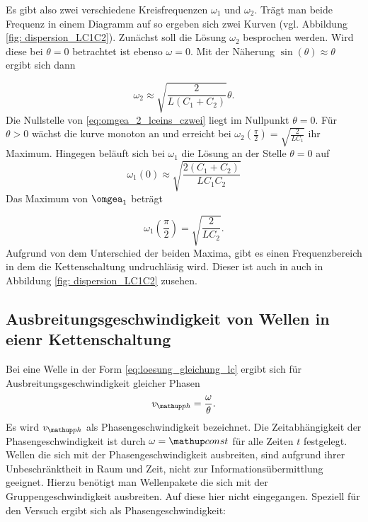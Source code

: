 Es gibt also zwei verschiedene Kreisfrequenzen $\omega_1$ und $\omega_2$.
Trägt man beide Frequenz in einem Diagramm auf so ergeben sich 
zwei Kurven (vgl. Abbildung \ref{fig: dispersion_LC1C2}). 
Zunächst soll die Lösung $\omega_2$ besprochen werden.
Wird diese bei $\theta=0$ betrachtet ist ebenso $\omega=0$.
Mit der Näherung $\sin(\theta)\approx\theta$ ergibt sich dann

\begin{equation}
\label{eq:omgea_2_lceins_czwei}
\omega_2\approx\sqrt{\frac{2}{L\left(C_1+C_2\right)}}\theta.
\end{equation}
Die Nullstelle von \eqref{eq:omgea_2_lceins_czwei} liegt im Nullpunkt $\theta=0$.
Für $\theta>0$ wächst die kurve monoton an und erreicht bei $\omega_2(\frac{\pi}{2})=\sqrt{\frac{2}{LC_1}}$
ihr Maximum. \newline
Hingegen beläuft sich bei $\omega_1$ die Lösung an der Stelle $\theta=0$ auf
\begin{equation*}
\omega_1(0)\approx\sqrt{\frac{2(C_1+C_2)}{LC_1C_2}}
\end{equation*}
Das Maximum von $\omgea_1$ beträgt

\begin{equation}
\label{eq:max_omega_1_ceins_czwei}
\omega_1(\frac{\pi}{2})=\sqrt{\frac{2}{LC_2}}.
\end{equation}
Aufgrund von dem Unterschied der beiden Maxima, gibt es einen Frequenzbereich in dem
die Kettenschaltung undruchläsig wird. Dieser ist auch in auch in Abbildung \ref{fig: dispersion_LC1C2}
zusehen.

\subsection{Ausbreitungsgeschwindigkeit von Wellen in eienr Kettenschaltung}
Bei eine Welle in der Form \eqref{eq:loesung_gleichung_lc}
ergibt sich für Ausbreitungsgeschwindigkeit gleicher Phasen
\begin{equation*}
v\ua{ph}=\frac{\omega}{\theta}.
\end{equation*}
Es wird $v\ua{ph}$ als Phasengeschwindigkeit bezeichnet.
Die Zeitabhängigkeit der Phasengeschwindigkeit ist durch $\omega=\map{const}$ 
für alle Zeiten $t$ festgelegt. Wellen die sich mit der Phasengeschwindigkeit
ausbreiten, sind aufgrund ihrer Unbeschränktheit in Raum und Zeit, nicht zur
Informationsübermittlung geeignet. Hierzu benötigt man Wellenpakete die sich 
mit der Gruppengeschwindigkeit ausbreiten. Auf diese hier nicht eingegangen.
Speziell für den Versuch ergibt sich als Phasengeschwindigkeit:

